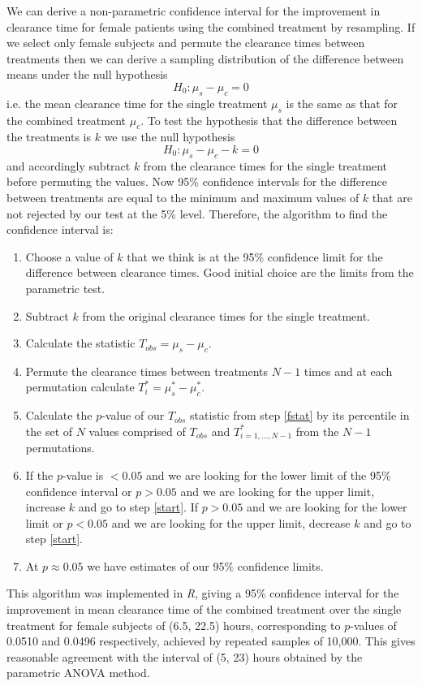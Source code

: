 We can derive a non-parametric confidence interval for the improvement in clearance time for female patients using the combined treatment by resampling. If we select only female subjects and permute the clearance times between treatments then we can derive a sampling distribution of the difference between means under the null hypothesis
$$H_{0}:\mu_{s}-\mu_{c}=0$$
i.e. the mean clearance time for the single treatment $\mu_{s}$ is the same as that for the combined treatment $\mu_{c}$. To test the hypothesis that the difference between the treatments is $k$ we use the null hypothesis
$$H_{0}:\mu_{s}-\mu_{c}-k=0$$
and accordingly subtract $k$ from the clearance times for the single treatment before permuting the values. Now 95\% confidence intervals for the difference between treatments are equal to the minimum and maximum values of $k$ that are not rejected by our test at the 5\% level. Therefore, the algorithm to find the confidence interval is:
\begin{enumerate}
\item Choose a value of $k$ that we think is at the 95\% confidence limit for the difference between clearance times. Good initial choice are the limits from the parametric test.
\item Subtract $k$ from the original clearance times for the single treatment.\label{start}
\item Calculate the statistic $T_{obs}=\mu_{s}-\mu_{c}$.\label{fstat}
\item Permute the clearance times between treatments $N-1$ times and at each permutation calculate $T^{*}_{i}=\mu_{s}^{*}-\mu_{c}^{*}$.
\item Calculate the $p$-value of our $T_{obs}$ statistic from step \ref{fstat} by its percentile in the set of $N$ values comprised of $T_{obs}$ and $T_{i=1,...,N-1}^{*}$ from the $N-1$ permutations.
\item If the $p$-value is $<0.05$ and we are looking for the lower limit of the 95\% confidence interval or $p>0.05$ and we are looking for the upper limit, increase $k$ and go to step \ref{start}. If $p>0.05$ and we are looking for the lower limit or $p<0.05$ and we are looking for the upper limit, decrease $k$ and go to step \ref{start}.
\item At $p\approx 0.05$ we have estimates of our 95\% confidence limits.
\end{enumerate}
This algorithm was implemented in \emph{R}, giving a 95\% confidence interval for the improvement in mean clearance time of the combined treatment over the single treatment for female subjects of (6.5, 22.5) hours, corresponding to $p$-values of 0.0510 and 0.0496 respectively, achieved by repeated samples of 10,000. This gives reasonable agreement with the interval of (5, 23) hours obtained by the parametric ANOVA method.

